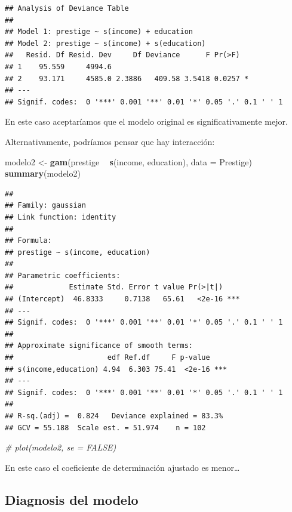 \documentclass[]{book}
\newenvironment{Shaded}{\begin{snugshade}}{\end{snugshade}}
\newcommand{\CommentTok}[1]{\textcolor[rgb]{0.56,0.35,0.01}{\textit{#1}}}
\newcommand{\DataTypeTok}[1]{\textcolor[rgb]{0.13,0.29,0.53}{#1}}
\newcommand{\KeywordTok}[1]{\textcolor[rgb]{0.13,0.29,0.53}{\textbf{#1}}}
\newcommand{\NormalTok}[1]{#1}
\newcommand{\OperatorTok}[1]{\textcolor[rgb]{0.81,0.36,0.00}{\textbf{#1}}}
\newcommand{\StringTok}[1]{\textcolor[rgb]{0.31,0.60,0.02}{#1}}
\begin{document}
\begin{verbatim}
## Analysis of Deviance Table
## 
## Model 1: prestige ~ s(income) + education
## Model 2: prestige ~ s(income) + s(education)
##   Resid. Df Resid. Dev     Df Deviance      F Pr(>F)  
## 1    95.559     4994.6                                
## 2    93.171     4585.0 2.3886   409.58 3.5418 0.0257 *
## ---
## Signif. codes:  0 '***' 0.001 '**' 0.01 '*' 0.05 '.' 0.1 ' ' 1
\end{verbatim}

En este caso aceptaríamos que el modelo original es significativamente mejor.

Alternativamente, podríamos pensar que hay interacción:

\begin{Shaded}
\begin{Highlighting}[]
\NormalTok{modelo2 <-}\StringTok{ }\KeywordTok{gam}\NormalTok{(prestige }\OperatorTok{~}\StringTok{ }\KeywordTok{s}\NormalTok{(income, education), }\DataTypeTok{data =}\NormalTok{ Prestige)}
\KeywordTok{summary}\NormalTok{(modelo2)}
\end{Highlighting}
\end{Shaded}

\begin{verbatim}
## 
## Family: gaussian 
## Link function: identity 
## 
## Formula:
## prestige ~ s(income, education)
## 
## Parametric coefficients:
##             Estimate Std. Error t value Pr(>|t|)    
## (Intercept)  46.8333     0.7138   65.61   <2e-16 ***
## ---
## Signif. codes:  0 '***' 0.001 '**' 0.01 '*' 0.05 '.' 0.1 ' ' 1
## 
## Approximate significance of smooth terms:
##                      edf Ref.df     F p-value    
## s(income,education) 4.94  6.303 75.41  <2e-16 ***
## ---
## Signif. codes:  0 '***' 0.001 '**' 0.01 '*' 0.05 '.' 0.1 ' ' 1
## 
## R-sq.(adj) =  0.824   Deviance explained = 83.3%
## GCV = 55.188  Scale est. = 51.974    n = 102
\end{verbatim}

\begin{Shaded}
\begin{Highlighting}[]
\CommentTok{# plot(modelo2, se = FALSE)}
\end{Highlighting}
\end{Shaded}

En este caso el coeficiente de determinación ajustado es menor\ldots{}

\hypertarget{diagnosis-del-modelo-2}{%
\subsection{Diagnosis del modelo}\label{diagnosis-del-modelo-2}}
\end{document}
